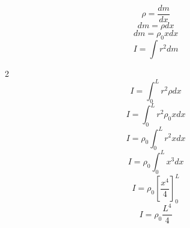 \documentclass[twoside]{article}
\begin{document}
\begin{enumerate}
\begin{equation*}
          \rho = \frac{dm}{dx}
        \end{equation*}
        \begin{equation*}
          dm = \rho dx
        \end{equation*}
        \begin{equation*}
          dm = \rho_0 x dx
        \end{equation*}
        \begin{equation*}
          I = \int r^2 dm
        \end{equation*}
        \begin{multicols}{2}
          \begin{equation*}
            I = \int_{0}^{L} r^2 \rho dx
          \end{equation*}
          \begin{equation*}
            I = \int_{0}^{L} r^2 \rho_0 x dx
          \end{equation*}
          \begin{equation*}
            I = \rho_0 \int_{0}^{L} r^2 x dx
          \end{equation*}
          \begin{equation*}
            I = \rho_0 \int_{0}^{L} x^3 dx
          \end{equation*}
          \begin{equation*}
            I = \rho_0 \left[\frac{x^4}{4}\right]_{0}^{L}
          \end{equation*}
          \begin{equation*}
            I = \rho_0 \frac{L^4}{4}
          \end{equation*}


\end{multicols}
\end{enumerate}
\end{document}
